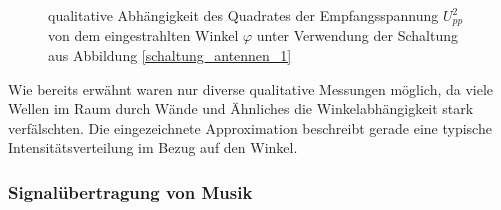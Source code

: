 		\begin{figure}[H]
			\center
			
			\caption{\centering qualitative Abhängigkeit des Quadrates der Empfangsspannung $U^2_{pp}$ von dem eingestrahlten Winkel $\varphi$ unter Verwendung der Schaltung aus Abbildung \ref{schaltung_antennen_1}}
			\label{diagramm_antenne_3}
		\end{figure}

		Wie bereits erwähnt waren nur diverse qualitative Messungen möglich, da viele Wellen im Raum durch Wände und Ähnliches die Winkelabhängigkeit stark verfälschten.
		Die eingezeichnete Approximation beschreibt gerade eine typische Intensitätsverteilung im Bezug auf den Winkel.




	\subsubsection{Signalübertragung von Musik}

